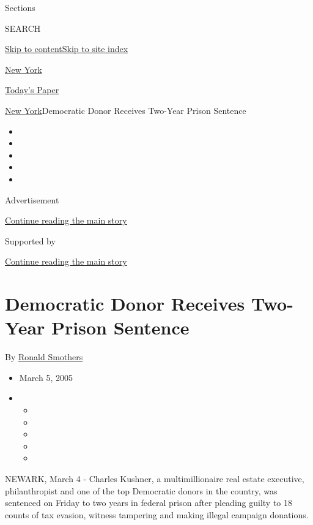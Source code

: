 Sections

SEARCH

\protect\hyperlink{site-content}{Skip to
content}\protect\hyperlink{site-index}{Skip to site index}

\href{https://www.nytimes.com/section/nyregion}{New York}

\href{https://myaccount.nytimes.com/auth/login?response_type=cookie\&client_id=vi}{}

\href{https://www.nytimes.com/section/todayspaper}{Today's Paper}

\href{/section/nyregion}{New York}\textbar{}Democratic Donor Receives
Two-Year Prison Sentence

\begin{itemize}
\item
\item
\item
\item
\item
\end{itemize}

Advertisement

\protect\hyperlink{after-top}{Continue reading the main story}

Supported by

\protect\hyperlink{after-sponsor}{Continue reading the main story}

\hypertarget{democratic-donor-receives-two-year-prison-sentence}{%
\section{Democratic Donor Receives Two-Year Prison
Sentence}\label{democratic-donor-receives-two-year-prison-sentence}}

By \href{https://www.nytimes.com/by/ronald-smothers}{Ronald Smothers}

\begin{itemize}
\item
  March 5, 2005
\item
  \begin{itemize}
  \item
  \item
  \item
  \item
  \item
  \end{itemize}
\end{itemize}

NEWARK, March 4 - Charles Kushner, a multimillionaire real estate
executive, philanthropist and one of the top Democratic donors in the
country, was sentenced on Friday to two years in federal prison after
pleading guilty to 18 counts of tax evasion, witness tampering and
making illegal campaign donations.

